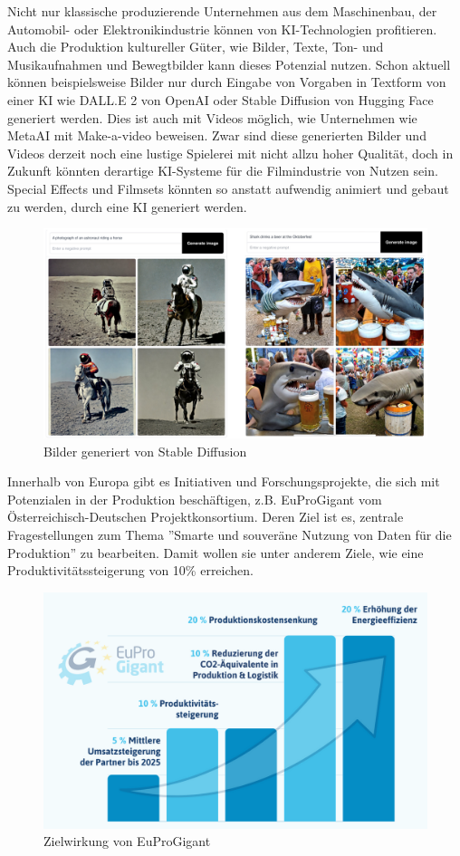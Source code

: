 \documentclass[a4paper,12pt, german]{report}
\begin{document}
Nicht nur klassische produzierende Unternehmen aus dem Maschinenbau, der Automobil- oder Elektronikindustrie können von KI-Technologien profitieren. Auch die Produktion kultureller Güter, wie Bilder, Texte, Ton- und Musikaufnahmen und Bewegtbilder kann dieses Potenzial nutzen. Schon aktuell können beispielsweise Bilder nur durch Eingabe von Vorgaben in Textform von einer KI wie DALL.E 2 von OpenAI oder Stable Diffusion von Hugging Face generiert werden. Dies ist auch mit Videos möglich, wie Unternehmen wie MetaAI mit Make-a-video beweisen. Zwar sind diese generierten Bilder und Videos derzeit noch eine lustige Spielerei mit nicht allzu hoher Qualität, doch in Zukunft könnten derartige KI-Systeme für die Filmindustrie von Nutzen sein. Special Effects und Filmsets könnten so anstatt aufwendig animiert und gebaut zu werden, durch eine KI generiert werden.

\begin{figure}[H]
  \center
 \includegraphics[width=14cm]{images/stableDif.png}
  \caption[Bilder generiert von Stable Diffusion]{Bilder generiert von Stable Diffusion \cite{38}}
\end{figure}

Innerhalb von Europa gibt es Initiativen und Forschungsprojekte, die sich mit Potenzialen in der Produktion beschäftigen, z.B. EuProGigant vom Österreichisch-Deutschen Projektkonsortium. Deren Ziel ist es, zentrale Fragestellungen zum Thema ''Smarte und souveräne Nutzung von Daten für die Produktion'' zu bearbeiten. Damit wollen sie unter anderem Ziele, wie eine Produktivitätssteigerung von 10\% erreichen.\cite{39}
\begin{figure}[H]
  \center
 \includegraphics[width=13cm]{images/eupro.png}
  \caption[Zielwirkung von EuProGigant]{Zielwirkung von EuProGigant \cite{39}}
\end{figure}
\end{document}
